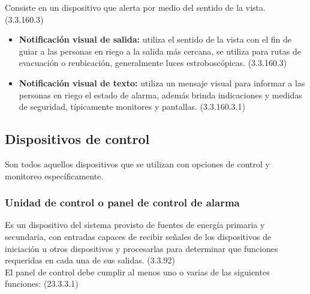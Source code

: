 Consiste en un dispositivo que alerta por medio del sentido de la vista. (3.3.160.3)


\begin{itemize}
	
	\item \textbf{Notificación visual de salida:} utiliza el sentido de la vista con el fin de guiar a las personas en riego a la salida más cercana, se utiliza para rutas de evacuación o reubicación, generalmente luces estroboscópicas. (3.3.160.3)
	
	\item \textbf{Notificación visual de texto:} utiliza un mensaje visual para informar a las personas en riego el estado de alarma, además brinda indicaciones y medidas de seguridad, típicamente monitores y pantallas. (3.3.160.3.1)
	
\end{itemize}



\subsection{Dispositivos de control}

Son todos aquellos dispositivos que se utilizan con opciones de control y monitoreo específicamente.


\subsubsection{Unidad de control o panel de control de alarma}


Es un dispositivo del sistema provisto de fuentes de energía primaria y secundaria, con entradas capaces de recibir señales de los dispositivos de iniciación u otros dispositivos y procesarlas para determinar que funciones requeridas en cada una de sus salidas. (3.3.92)\cite{NFPA72}\\

El panel de control debe cumplir al menos uno o varias de las siguientes funciones: (23.3.3.1)


